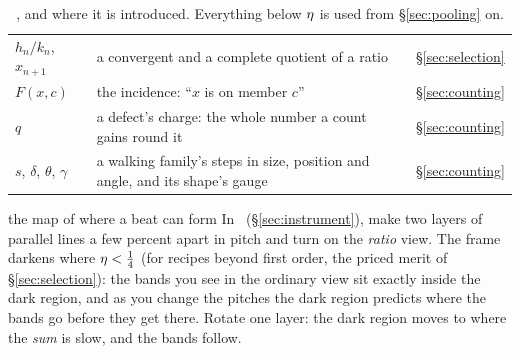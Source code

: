 \begin{table}[t]
\begin{tabular}{@{}lll@{}}
    $h_n/k_n$, $x_{n+1}$ & a convergent and a complete quotient of a ratio & \S\ref{sec:selection} \\
    $F(x,c)$ & the incidence: ``$x$ is on member $c$'' & \S\ref{sec:counting} \\
    $q$ & a defect's charge: the whole number a count gains round it & \S\ref{sec:counting} \\
    $s$, $\delta$, $\theta$, $\gamma$ & a walking family's steps in size, position and angle, and its shape's gauge & \S\ref{sec:counting} \\
    \bottomrule
  \end{tabular}
  \caption{, and where it is introduced.
  Everything below $\eta$ is used from \S\ref{sec:pooling} on.}
  \label{tab:symbols}
\end{table}

\begin{tryit}{the map of where a beat can form}
In \Moire\ (\S\ref{sec:instrument}), make two layers of parallel lines a few
percent apart in pitch and turn on the \emph{ratio} view. The frame darkens
where $\eta<\tfrac14$ (for recipes beyond first order, the priced merit of
\S\ref{sec:selection}): the bands you see in the ordinary view sit exactly
inside the dark region, and as you change the pitches the dark region
predicts where the bands go before they get there. Rotate one layer: the
dark region moves to where the \emph{sum} is slow, and the bands follow.
\end{tryit}
